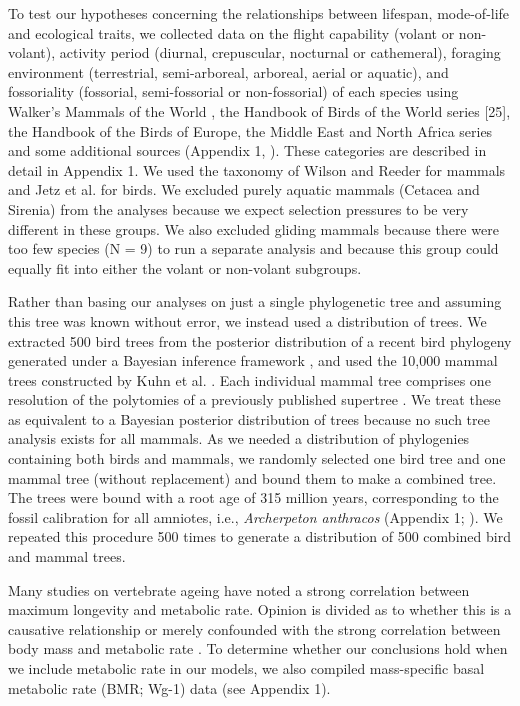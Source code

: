 To test our hypotheses concerning the relationships between lifespan, mode-of-life and ecological traits, we collected data on the flight capability (volant or non-volant), activity period (diurnal, crepuscular, nocturnal or cathemeral), foraging environment (terrestrial, semi-arboreal, arboreal, aerial or aquatic), and fossoriality (fossorial, semi-fossorial or non-fossorial) of each species using Walker's Mammals of the World \citep{nowak1999walker}, the Handbook of Birds of the World series \citep{hoyo1992handbook}[25], the Handbook of the Birds of Europe, the Middle East and North Africa series \citep{cramp1977handbook} and some additional sources (Appendix 1, \citep{fry2010kingfishers,parr2010parrots,williams1995penguins}). These categories are described in detail in Appendix 1. We used the taxonomy of Wilson and Reeder \citep{wilson2005mammal} for mammals and Jetz et al. \cite{jetz2012global} for birds. We excluded purely aquatic mammals (Cetacea and Sirenia) from the analyses because we expect selection pressures to be very different in these groups. We also excluded gliding mammals because there were too few species (N = 9) to run a separate analysis and because this group could equally fit into either the volant or non-volant subgroups.

Rather than basing our analyses on just a single phylogenetic tree and assuming this tree was known without error, we instead used a distribution of trees. We extracted 500 bird trees from the posterior distribution of a recent bird phylogeny generated under a Bayesian inference framework \citep{jetz2012global}, and used the 10,000 mammal trees constructed by Kuhn et al. \citep{kuhn2011simple}. Each individual mammal tree comprises one resolution of the polytomies of a previously published supertree \citep{bininda2007delayed}. We treat these as equivalent to a Bayesian posterior distribution of trees because no such tree analysis exists for all mammals. As we needed a distribution of phylogenies containing both birds and mammals, we randomly selected one bird tree and one mammal tree (without replacement) and bound them to make a combined tree. The trees were bound with a root age of 315 million years, corresponding to the fossil calibration for all amniotes, i.e.,  \textit{Archerpeton anthracos} (Appendix 1; \citep{reisz2004molecular}). We repeated this procedure 500 times to generate a distribution of 500 combined bird and mammal trees.

Many studies on vertebrate ageing have noted a strong correlation between maximum longevity and metabolic rate. Opinion is divided as to whether this is a causative relationship or merely confounded with the strong correlation between body mass and metabolic rate \citep{ricklefs2010insights}. To determine whether our conclusions hold when we include metabolic rate in our models, we also compiled mass-specific basal metabolic rate (BMR; Wg-1) data (see Appendix 1).


